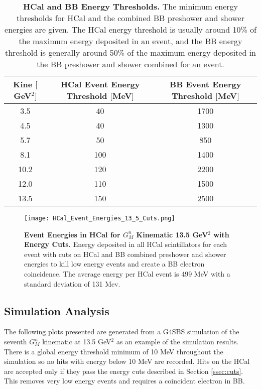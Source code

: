 \documentclass[10pt]{article}
\begin{document}
	\begin{table}[h]
	\centering
	\begin{tabular}{|c|cc|}
	\hline
	\makecell{Kine\\$[$GeV$^2]$} & \makecell{HCal Event Energy\\Threshold $[$MeV$]$} & \makecell{BB Event Energy\\Threshold $[$MeV$]$}\\
	\hline
	3.5 & 40 & 1700\\
    4.5 & 40 & 1300\\
    5.7 & 50 & 850\\
    8.1 & 100 & 1400\\
    10.2 & 120 & 2200\\
    12.0 & 110 & 1500\\
    13.5 & 150 & 2500\\
	\hline
	\end{tabular}
	\caption{{\bf{HCal and BB Energy Thresholds.}} The minimum energy thresholds for HCal and the combined BB preshower and shower energies are given. The HCal energy threshold is usually around 10\% of the maximum energy deposited in an event, and the BB energy threshold is generally around 50\% of the maximum energy deposited in the BB preshower and shower combined for an event.} %
	\label{tab:thresholds}
	\end{table}
	
	\begin{figure}[!ht]
	\begin{center}
	\texttt{[image: HCal\_Event\_Energies\_13\_5\_Cuts.png]}
	\end{center}
	\caption{
	{\bf{Event Energies in HCal for $G_M^n$ Kinematic 13.5 GeV$^2$ with Energy Cuts.}} Energy deposited in all HCal scintillators for each event with cuts on HCal and BB combined preshower and shower energies to kill low energy events and create a BB electron coincidence. The average energy per HCal event is 499 MeV with a standard deviation of 131 Mev.}
	\label{fig:hcal_evt_eng_cuts}
	\end{figure}

\subsection{Simulation Analysis}

	The following plots presented are generated from a G4SBS simulation of the seventh $G_M^n$ kinematic at 13.5 GeV$^2$ as an example of the simulation results. There is a global energy threshold minimum of 10 MeV throughout the simulation so no hits with energy below 10 MeV are recorded. Hits on the HCal are accepted only if they pass the energy cuts described in Section \ref{ssec:cuts}. This removes very low energy events and requires a coincident electron in BB.\\
	
\end{document}

